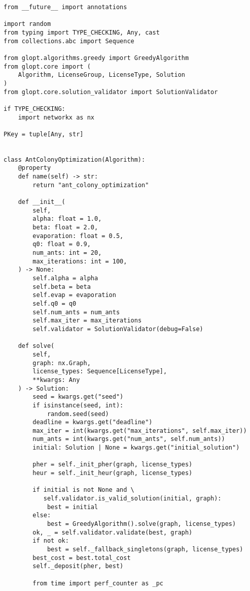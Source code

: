 {\footnotesize
\begin{verbatim}
from __future__ import annotations

import random
from typing import TYPE_CHECKING, Any, cast
from collections.abc import Sequence

from glopt.algorithms.greedy import GreedyAlgorithm
from glopt.core import (
    Algorithm, LicenseGroup, LicenseType, Solution
)
from glopt.core.solution_validator import SolutionValidator

if TYPE_CHECKING:
    import networkx as nx

PKey = tuple[Any, str]


class AntColonyOptimization(Algorithm):
    @property
    def name(self) -> str:
        return "ant_colony_optimization"

    def __init__(
        self,
        alpha: float = 1.0,
        beta: float = 2.0,
        evaporation: float = 0.5,
        q0: float = 0.9,
        num_ants: int = 20,
        max_iterations: int = 100,
    ) -> None:
        self.alpha = alpha
        self.beta = beta
        self.evap = evaporation
        self.q0 = q0
        self.num_ants = num_ants
        self.max_iter = max_iterations
        self.validator = SolutionValidator(debug=False)

    def solve(
        self,
        graph: nx.Graph,
        license_types: Sequence[LicenseType],
        **kwargs: Any
    ) -> Solution:
        seed = kwargs.get("seed")
        if isinstance(seed, int):
            random.seed(seed)
        deadline = kwargs.get("deadline")
        max_iter = int(kwargs.get("max_iterations", self.max_iter))
        num_ants = int(kwargs.get("num_ants", self.num_ants))
        initial: Solution | None = kwargs.get("initial_solution")

        pher = self._init_pher(graph, license_types)
        heur = self._init_heur(graph, license_types)

        if initial is not None and \
           self.validator.is_valid_solution(initial, graph):
            best = initial
        else:
            best = GreedyAlgorithm().solve(graph, license_types)
        ok, _ = self.validator.validate(best, graph)
        if not ok:
            best = self._fallback_singletons(graph, license_types)
        best_cost = best.total_cost
        self._deposit(pher, best)

        from time import perf_counter as _pc


\end{verbatim}}

